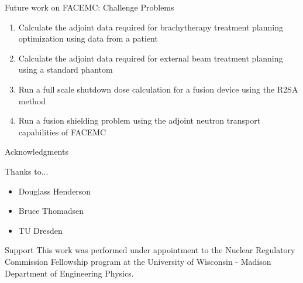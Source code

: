 \documentclass{beamer}
\begin{document}
\begin{frame}{Future work on FACEMC: Challenge Problems}
  
    \begin{enumerate}
      \item Calculate the adjoint data required for brachytherapy treatment 
        planning optimization using data from a patient
        \medskip
      \item Calculate the adjoint data required for external beam treatment 
        planning using a standard phantom
        \medskip
      \item Run a full scale shutdown dose calculation for a fusion device using
        the R2SA method
        \medskip
      \item Run a fusion shielding problem using the adjoint neutron transport 
        capabilities of FACEMC
        \medskip
    \end{enumerate}
  
\end{frame}

\begin{frame}{Acknowledgments}

  Thanks to...
  
  \begin{itemize}
    \item Douglass Henderson
    \item Bruce Thomadsen
    \item TU Dresden
  \end{itemize}

  \medskip \medskip \medskip \medskip \medskip \medskip \medskip

  \begin{beamerboxesrounded}[upper=boxheadcolor,lower=boxbodycolor,shadow=true]{Support}
    This work was performed under appointment to the Nuclear Regulatory
    Commission Fellowship program at the University of Wisconsin - Madison
    Department of Engineering Physics.
  \end{beamerboxesrounded}

\end{frame}

\end{document}
